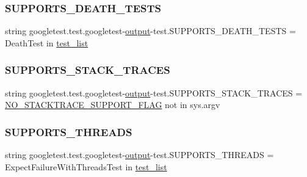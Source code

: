 \subsubsection{\texorpdfstring{SUPPORTS\_DEATH\_TESTS}{SUPPORTS\_DEATH\_TESTS}}
{\footnotesize\ttfamily string googletest.\+test.\+googletest-\/\mbox{\hyperlink{namespacegoogletest_1_1test_1_1googletest-output-test_a6773c2217ae4694b4db5610620562437}{output}}-\/test.\+S\+U\+P\+P\+O\+R\+T\+S\+\_\+\+D\+E\+A\+T\+H\+\_\+\+T\+E\+S\+TS = \textquotesingle{}Death\+Test\textquotesingle{} in \mbox{\hyperlink{namespacegoogletest_1_1test_1_1googletest-output-test_a444fd372288937a5fb698098ef061576}{test\+\_\+list}}}

\mbox{\label{namespacegoogletest_1_1test_1_1googletest-output-test_a07d6f9ec7cb3d0bc672ff2e4cbd8eaa2}} 
\subsubsection{\texorpdfstring{SUPPORTS\_STACK\_TRACES}{SUPPORTS\_STACK\_TRACES}}
{\footnotesize\ttfamily string googletest.\+test.\+googletest-\/\mbox{\hyperlink{namespacegoogletest_1_1test_1_1googletest-output-test_a6773c2217ae4694b4db5610620562437}{output}}-\/test.\+S\+U\+P\+P\+O\+R\+T\+S\+\_\+\+S\+T\+A\+C\+K\+\_\+\+T\+R\+A\+C\+ES = \mbox{\hyperlink{namespacegoogletest_1_1test_1_1googletest-output-test_a6d6b31f6d4a75dc726bf1d7b21a1b89e}{N\+O\+\_\+\+S\+T\+A\+C\+K\+T\+R\+A\+C\+E\+\_\+\+S\+U\+P\+P\+O\+R\+T\+\_\+\+F\+L\+AG}} not in sys.\+argv}

\mbox{\label{namespacegoogletest_1_1test_1_1googletest-output-test_a56afd7a24670ca774f8619905e73d1b2}} 
\subsubsection{\texorpdfstring{SUPPORTS\_THREADS}{SUPPORTS\_THREADS}}
{\footnotesize\ttfamily string googletest.\+test.\+googletest-\/\mbox{\hyperlink{namespacegoogletest_1_1test_1_1googletest-output-test_a6773c2217ae4694b4db5610620562437}{output}}-\/test.\+S\+U\+P\+P\+O\+R\+T\+S\+\_\+\+T\+H\+R\+E\+A\+DS = \textquotesingle{}Expect\+Failure\+With\+Threads\+Test\textquotesingle{} in \mbox{\hyperlink{namespacegoogletest_1_1test_1_1googletest-output-test_a444fd372288937a5fb698098ef061576}{test\+\_\+list}}}

